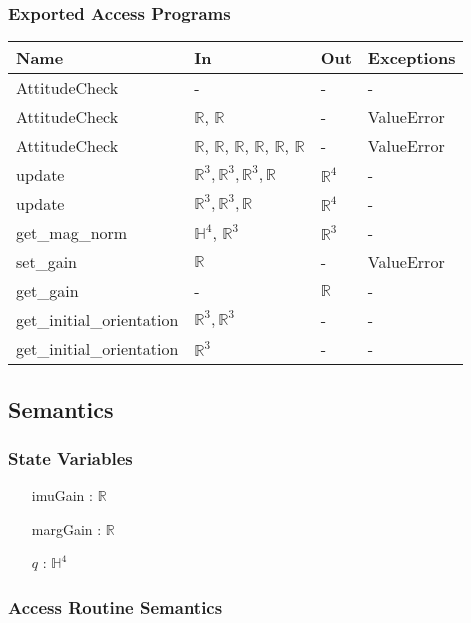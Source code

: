 \documentclass[12pt, titlepage]{article}
\begin{document}
\subsubsection{Exported Access Programs}

\begin{center}
\begin{tabular}{p{5cm} p{4cm} p{1.5cm} p{2.5cm}}
\hline
\textbf{Name} & \textbf{In} & \textbf{Out} & \textbf{Exceptions} \\
\hline
AttitudeCheck & - & - & - \\
AttitudeCheck & $\mathbb{R}$, $\mathbb{R}$ & - & ValueError \\
AttitudeCheck & $\mathbb{R}$, $\mathbb{R}$, $\mathbb{R}$, $\mathbb{R}$, $\mathbb{R}$, $\mathbb{R}$ &
- & ValueError \\
update & $\mathbb{R}^3, \mathbb{R}^3, \mathbb{R}^3, \mathbb{R}$ & $\mathbb{R}^4$ & - \\
update & $\mathbb{R}^3, \mathbb{R}^3, \mathbb{R}$ & $\mathbb{R}^4$ & - \\
get\_mag\_norm & $\mathbb{H}^4$, $\mathbb{R}^3$ & $\mathbb{R}^3$ & - \\
set\_gain & $\mathbb{R}$ & - & ValueError \\
get\_gain & - & $\mathbb{R}$ & - \\
get\_initial\_orientation & $\mathbb{R}^3, \mathbb{R}^3$ & - & - \\
get\_initial\_orientation & $\mathbb{R}^3$ & - & - \\
\hline
\end{tabular}
\end{center}

\subsection{Semantics}

\subsubsection{State Variables}
\begin{itemize}
  \item[imuGain] : $\mathbb{R}$
  \item[margGain] : $\mathbb{R}$
  \item[$q$] :  $\mathbb{H}^4$
\end{itemize}

\subsubsection{Access Routine Semantics}
\end{document}
